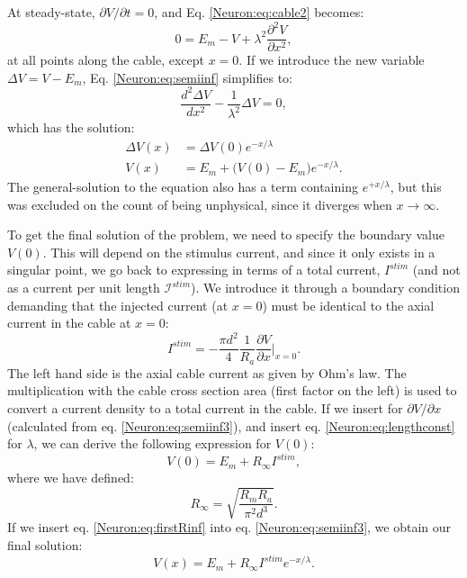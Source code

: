 At steady-state, $\partial V/\partial t = 0$, and Eq. \ref{Neuron:eq:cable2} becomes:
\begin{equation}
0 = E_m-V +  \lambda^2 \frac{\partial^2 V}{\partial x^2}, 
\label{Neuron:eq:semiinf}
\end{equation}
at all points along the cable, except $x=0$. If we introduce the new variable $\Delta{V}=V-E_m$, Eq. \ref{Neuron:eq:semiinf} simplifies to:
\begin{equation}
\frac{d^2 \Delta{V}}{d x^2} -  \frac{1}{\lambda^2} \Delta{V}=0, 
\label{Neuron:eq:semiinf2}
\end{equation}
which has the solution:
\begin{align}
\Delta{V}(x) &= \Delta{V}(0) e^{-x/\lambda} \\
V(x) &= E_m + \big( V(0)-E_m \big) e^{-x/\lambda}.
\label{Neuron:eq:semiinf3}
\end{align}
The general-solution to the equation also has a term containing $e^{+x/\lambda}$, but this was excluded on the count of being unphysical, since it diverges when $x \rightarrow \infty$. 

To get the final solution of the problem, we need to specify the boundary value $V(0)$. This will depend on the stimulus current, and since it only exists in a singular point, we go back to expressing in terms of a total current, $I^{stim}$ (and not as a current per unit length $\mathcal{I}^{stim}$). We introduce it through a boundary condition demanding that the injected current (at $x=0$) must be identical to the axial current in the cable at $x=0$:
\begin{equation}
I^{stim} = - \frac{\pi d^2}{4}\frac{1}{R_a} \frac{\partial V}{\partial x}   \Big|_{x=0}.
\end{equation}
The left hand side is the axial cable current as given by Ohm's law. The multiplication with the cable cross section area (first factor on the left) is used to convert a current density to a total current in the cable. If we insert for $\partial V/\partial x$ (calculated from eq. \ref{Neuron:eq:semiinf3}), and insert eq. \ref{Neuron:eq:lengthconst} for $\lambda$, we can derive the following expression for $V(0)$:
\begin{equation}
V(0) = E_m + R_{\infty}I^{stim}, 
\label{Neuron:eq:firstRinf}
\end{equation}
where we have defined:
\begin{equation}
R_{\infty} = \sqrt{\frac{R_m R_a}{\pi^2 d^3}}.
\label{Neuron:eq:Rinf}
\end{equation}
If we insert eq. \ref{Neuron:eq:firstRinf} into eq. \ref{Neuron:eq:semiinf3}, we obtain our final solution:
\begin{equation}
V(x) = E_m +R_{\infty}I^{stim}  e^{-x/\lambda}.
\label{Neuron:eq:semiinf4}
\end{equation}

